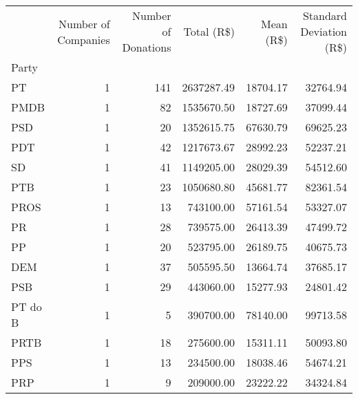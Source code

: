\begin{tabular}{lrrrrr}
\toprule
{} &  Number of Companies &  Number of Donations &  Total (R\$) &  Mean (R\$) &  Standard Deviation (R\$) \\
Party   &                      &                      &             &            &                          \\
\midrule
PT      &                    1 &                  141 &  2637287.49 &   18704.17 &                 32764.94 \\
PMDB    &                    1 &                   82 &  1535670.50 &   18727.69 &                 37099.44 \\
PSD     &                    1 &                   20 &  1352615.75 &   67630.79 &                 69625.23 \\
PDT     &                    1 &                   42 &  1217673.67 &   28992.23 &                 52237.21 \\
SD      &                    1 &                   41 &  1149205.00 &   28029.39 &                 54512.60 \\
PTB     &                    1 &                   23 &  1050680.80 &   45681.77 &                 82361.54 \\
PROS    &                    1 &                   13 &   743100.00 &   57161.54 &                 53327.07 \\
PR      &                    1 &                   28 &   739575.00 &   26413.39 &                 47499.72 \\
PP      &                    1 &                   20 &   523795.00 &   26189.75 &                 40675.73 \\
DEM     &                    1 &                   37 &   505595.50 &   13664.74 &                 37685.17 \\
PSB     &                    1 &                   29 &   443060.00 &   15277.93 &                 24801.42 \\
PT do B &                    1 &                    5 &   390700.00 &   78140.00 &                 99713.58 \\
PRTB    &                    1 &                   18 &   275600.00 &   15311.11 &                 50093.80 \\
PPS     &                    1 &                   13 &   234500.00 &   18038.46 &                 54674.21 \\
PRP     &                    1 &                    9 &   209000.00 &   23222.22 &                 34324.84 \\

\end{tabular}
